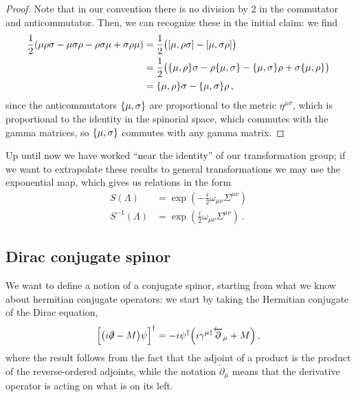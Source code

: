 \documentclass[main.tex]{subfiles}
\begin{document}
\begin{proof}
Note that in our convention there is no division by 2 in the commutator and anticommutator. 
Then, we can recognize these in the initial claim: we find 
%
\begin{subequations}
\begin{align}
\frac{1}{2} \qty( \mu  \rho \sigma  - \mu  \sigma  \rho  -  \rho  \sigma  \mu  +  \sigma   \rho   \mu )
&= \frac{1}{2} \qty(\qty[\mu, \rho \sigma ] - \qty[\mu, \sigma \rho ])  \\
&= \frac{1}{2} \qty(\qty{\mu, \rho } \sigma - \rho \qty{\mu, \sigma } -
\qty{\mu, \sigma } \rho + \sigma \qty{\mu, \rho })  \\
&= \qty{\mu, \rho } \sigma - \qty{\mu, \sigma } \rho 
\,,
\end{align}
\end{subequations}
%
since the anticommutators \(\qty{\mu, \sigma }\) are proportional to the metric \(\eta^{\mu \sigma }\), which is proportional to the identity in the spinorial space, which commutes with the gamma matrices, so \(\qty{\mu , \sigma }\) commutes with any gamma matrix. 
\end{proof}

Up until now we have worked ``near the identity'' of our transformation group; if we want to extrapolate these results to general transformations we may use the exponential map, which gives us relations in the form 
%
\begin{subequations}
\begin{align}
S(\Lambda ) &= \exp( -\frac{i}{2} \omega_{\mu \nu } \Sigma^{\mu \nu })  \\
S^{-1} (\Lambda ) &= \exp(\frac{i}{2} \omega_{\mu \nu } \Sigma^{\mu \nu })
\,.
\end{align}
\end{subequations}
%

\subsection{Dirac conjugate spinor}

We want to define a notion of a conjugate spinor, starting from what we know about hermitian conjugate operators: we start by taking the Hermitian conjugate of the Dirac equation, 
%
\begin{align}
\qty[\qty(i \slashed{\partial} -M) \psi ]^\dag = - i \psi ^\dag \qty(i \gamma^{\mu \dag} \overleftarrow{\partial}_{\mu } + M )
\,,
\end{align}
%
where the result follows from the fact that the adjoint of a product is the product of the reverse-ordered adjoints, while the notation \(\overleftarrow{\partial}_{\mu }\) means that the derivative operator is acting on what is on its left. 
\end{document}

